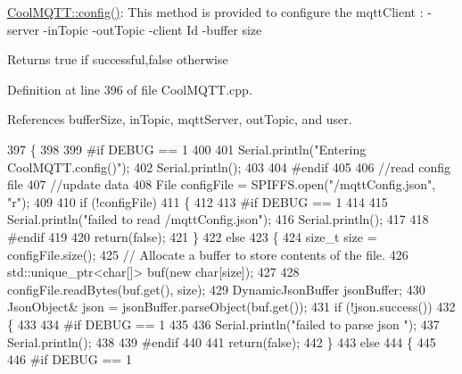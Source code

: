 \hyperlink{classCoolMQTT_a6571671781a505feca9a8a56e256c6bc}{Cool\+M\+Q\+T\+T\+::config()}\+: This method is provided to configure the mqtt\+Client \+: -\/server -\/in\+Topic -\/out\+Topic -\/client Id -\/buffer size

\begin{DoxyReturn}{Returns}
true if successful,false otherwise 
\end{DoxyReturn}


Definition at line 396 of file Cool\+M\+Q\+T\+T.\+cpp.



References buffer\+Size, in\+Topic, mqtt\+Server, out\+Topic, and user.


\begin{DoxyCode}
397 \{
398 
399 \textcolor{preprocessor}{#if DEBUG == 1 }
400 
401     Serial.println(\textcolor{stringliteral}{"Entering CoolMQTT.config()"});
402     Serial.println();
403 
404 \textcolor{preprocessor}{#endif}
405 
406     \textcolor{comment}{//read config file}
407     \textcolor{comment}{//update data}
408     File configFile = SPIFFS.open(\textcolor{stringliteral}{"/mqttConfig.json"}, \textcolor{stringliteral}{"r"});
409 
410     \textcolor{keywordflow}{if} (!configFile) 
411     \{
412     
413 \textcolor{preprocessor}{    #if DEBUG == 1 }
414 
415         Serial.println(\textcolor{stringliteral}{"failed to read /mqttConfig.json"});
416         Serial.println();
417 
418 \textcolor{preprocessor}{    #endif}
419 
420         \textcolor{keywordflow}{return}(\textcolor{keyword}{false});
421     \}
422     \textcolor{keywordflow}{else}
423     \{
424         \textcolor{keywordtype}{size\_t} size = configFile.size();
425         \textcolor{comment}{// Allocate a buffer to store contents of the file.}
426         std::unique\_ptr<char[]> buf(\textcolor{keyword}{new} \textcolor{keywordtype}{char}[size]);
427 
428         configFile.readBytes(buf.get(), size);
429         DynamicJsonBuffer jsonBuffer;
430         JsonObject& json = jsonBuffer.parseObject(buf.get());
431         \textcolor{keywordflow}{if} (!json.success()) 
432         \{
433         
434 \textcolor{preprocessor}{        #if DEBUG == 1 }
435 
436             Serial.println(\textcolor{stringliteral}{"failed to parse json "});
437             Serial.println();
438         
439 \textcolor{preprocessor}{        #endif}
440             
441             \textcolor{keywordflow}{return}(\textcolor{keyword}{false});
442         \} 
443         \textcolor{keywordflow}{else}
444         \{
445         
446 \textcolor{preprocessor}{        #if DEBUG == 1 }

\end{DoxyCode}
